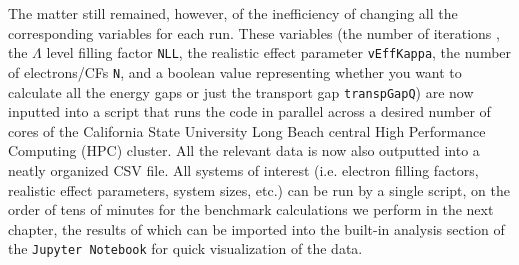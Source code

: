     The matter still remained, however, of the inefficiency of changing all the corresponding variables for each run. These variables (the number of iterations , the $\Lambda$ level filling factor \texttt{NLL}, the realistic effect parameter \texttt{vEffKappa}, the number of electrons/CFs \texttt{N}, and a boolean value representing whether you want to calculate all the energy gaps or just the transport gap \texttt{transpGapQ}) are now inputted into a script that runs the code in parallel across a desired number of cores of the California State University Long Beach central High Performance Computing (HPC) cluster. All the relevant data is now also outputted into a neatly organized CSV file. All systems of interest (i.e. electron filling factors, realistic effect parameters, system sizes, etc.) can be run by a single script, on the order of tens of minutes for the benchmark calculations we perform in the next chapter, the results of which can be imported into the built-in analysis section of the \texttt{Jupyter Notebook} for quick visualization of the data.
    
